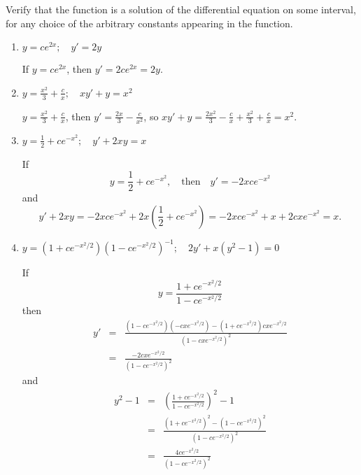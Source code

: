 \documentclass{ximera}
\begin{document}
\begin{problem}\label{exer:1.2.2}
Verify that the  function is a solution of the
differential equation on some interval, for any choice of
the arbitrary constants appearing in the function.

\begin{enumerate}
\item %
 $y=ce^{2x};     \quad y'=2y$



\begin{solution}
    If $y=ce^{2x}$, then $y'=2ce^{2x}=2y$.
\end{solution}
 
\item %
 $y=\frac{x^2}{3}
+\frac{c}{x};   \quad xy'+y=x^2$



\begin{solution}
    $y=\frac{x^2}{3}+\frac{c}{x}$, then
$y'=\frac{2x}{3}-\frac{c}{x^2}$, so $xy'+y=\frac{2x^2}{3}-\frac{c}{x
}+\frac{x^2}{3}+\frac{c}{x}=x^2$.
\end{solution}

\item %
$y=\frac{1}{2}+ce^{-x^2};    \quad y'+2xy=x$



\begin{solution}
    If
$$
y=\frac{1}{2}+ce^{-x^2}, \quad \text{then} \quad
y'=-2xce^{-x^2}
$$
and
$$
y'+2xy=-2xce^{-x^2}+2x\left(\frac{1}{2}+ce^{-x^2}\right)
=-2xce^{-x^2}+x+2cxe^{-x^2}=x.
$$
\end{solution}

\item %
$y=(1+ce^{-x^2/2})(1-ce^{-x^2/2})^{-1};   \quad
2y'+x(y^2-1)=0$



\begin{solution}
    If
$$
y=\frac{1+ce^{-x^2/2}}{1-ce^{-x^2/2}}
$$
then
\begin{eqnarray*}
y'&=&\frac{(1-ce^{-x^2/2})(-cxe^{-x^2/2})-(1+ce^{-x^2/2})cxe^{-x^2/2}}{(1-cxe^{-x^2/2})^2}\\
&=&\frac{-2cxe^{-x^2/2}}{(1-ce^{-x^2/2})^2}
\end{eqnarray*}
and
\begin{eqnarray*}
y^2-1&=&\left(\frac{1+ce^{-x^2/2}}{1-ce^{-x^2/2}}\right)^2-1\\
&=&\frac{(1+ce^{-x^2/2})^2-(1-ce^{-x^2/2})^2}{(1-ce^{-x^2/2})^2}\\
&=&\frac{4ce^{-x^2/2}}{(1-ce^{-x^2/2})^2}
\end{eqnarray*}


\end{solution}
\end{enumerate}
\end{problem}
\end{document}
